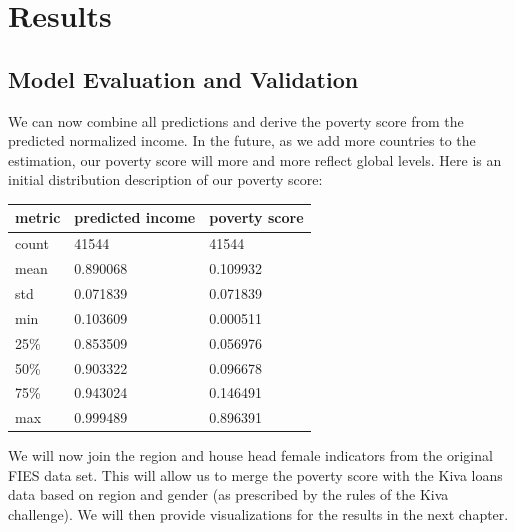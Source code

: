 \documentclass{article}
\begin{document}
\section{Results}
\subsection{Model Evaluation and Validation}
We can now combine all predictions and derive the poverty score from the predicted normalized income. In the future, as we add more countries to the estimation, our poverty score will more and more reflect global levels. Here is an initial distribution description of our poverty score:

\begin{center}
\begin{tabular}{ |l|l|l| }
  \hline
  metric &  predicted income & poverty score\\
  \hline
  count & 41544 & 41544\\
  mean & 0.890068 & 0.109932\\
  std & 0.071839 & 0.071839\\
  min & 0.103609 & 0.000511\\
  25\% & 0.853509 & 0.056976\\
  50\% & 0.903322 & 0.096678\\
  75\% & 0.943024 & 0.146491\\
  max & 0.999489 & 0.896391\\
  \hline
\end{tabular}
\end{center}

We will now join the region and house head female indicators from the original FIES data set. This will allow us to merge the poverty score with the Kiva loans data based on region and gender (as prescribed by the rules of the Kiva challenge). We will then provide visualizations for the results in the next chapter.
\end{document}
